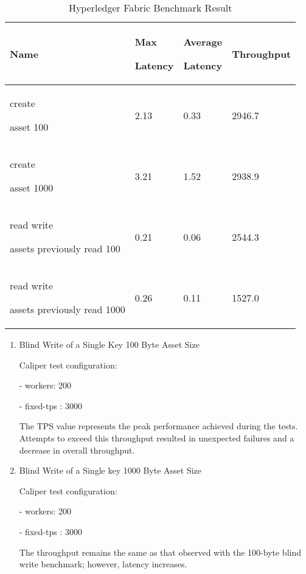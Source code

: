 \documentclass[conference]{IEEEtran}
\begin{document}
\begin{enumerate}[itemsep=2ex, parsep=1ex]
\begin{enumerate}[itemsep=2ex, parsep=1ex]
					\begin{table}[h]
						\caption{Hyperledger Fabric Benchmark Result}
						\def\arraystretch{1.4} \small
						\begin{tabular}{|p{1.7cm}|p{1.5cm}|p{1.5cm}|p{1.7cm}|}
							\hline
							Name                                        & Max \par Latency & Average \par Latency & Throughput \\
							\hline
							create \par asset 100                       & 2.13             & 0.33                 & 2946.7     \\
							\hline
							create \par asset 1000                      & 3.21             & 1.52                 & 2938.9     \\
							\hline
							read write \par assets previously read 100  & 0.21             & 0.06                 & 2544.3     \\
							\hline
							read write \par assets previously read 1000 & 0.26             & 0.11                 & 1527.0     \\
							\hline
						\end{tabular}
					\end{table}

					\begin{enumerate}[itemsep=2ex, parsep=1ex]
						\item Blind Write of a Single Key 100 Byte Asset Size

							Caliper test configuration:

							- workers: 200

							- fixed-tps : 3000

							The TPS value represents the peak performance achieved during the tests.
							Attempts to exceed this throughput resulted in unexpected failures
							and a decrease in overall throughput.

						\item Blind Write of a Single key 1000 Byte Asset Size

							Caliper test configuration:

							- workers: 200

							- fixed-tps : 3000

							The throughput remains the same as that observed with the 100-byte
							blind write benchmark; however, latency increases.


\end{enumerate}
\end{enumerate}
\end{enumerate}
\end{document}
